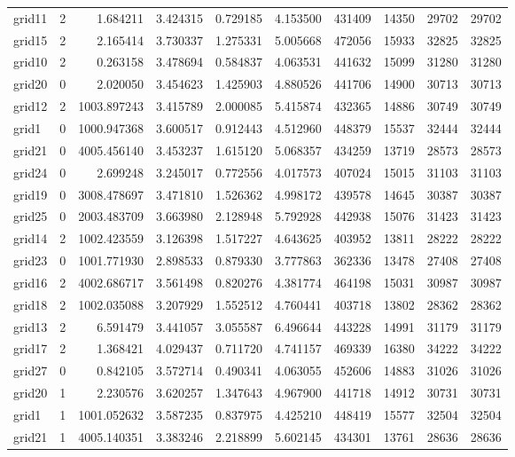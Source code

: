 \documentclass[../../../thesis.tex]{subfiles}
\begin{document}
\begin{longtable}{|l|r|r|r|r|r|r|r|r|r|}
grid11 & 2 & 1.684211 & 3.424315 & 0.729185 & 4.153500 & 431409 & 14350 & 29702 & 29702 \\
grid15 & 2 & 2.165414 & 3.730337 & 1.275331 & 5.005668 & 472056 & 15933 & 32825 & 32825 \\
grid10 & 2 & 0.263158 & 3.478694 & 0.584837 & 4.063531 & 441632 & 15099 & 31280 & 31280 \\
grid20 & 0 & 2.020050 & 3.454623 & 1.425903 & 4.880526 & 441706 & 14900 & 30713 & 30713 \\
grid12 & 2 & 1003.897243 & 3.415789 & 2.000085 & 5.415874 & 432365 & 14886 & 30749 & 30749 \\
grid1 & 0 & 1000.947368 & 3.600517 & 0.912443 & 4.512960 & 448379 & 15537 & 32444 & 32444 \\
grid21 & 0 & 4005.456140 & 3.453237 & 1.615120 & 5.068357 & 434259 & 13719 & 28573 & 28573 \\
grid24 & 0 & 2.699248 & 3.245017 & 0.772556 & 4.017573 & 407024 & 15015 & 31103 & 31103 \\
grid19 & 0 & 3008.478697 & 3.471810 & 1.526362 & 4.998172 & 439578 & 14645 & 30387 & 30387 \\
grid25 & 0 & 2003.483709 & 3.663980 & 2.128948 & 5.792928 & 442938 & 15076 & 31423 & 31423 \\
grid14 & 2 & 1002.423559 & 3.126398 & 1.517227 & 4.643625 & 403952 & 13811 & 28222 & 28222 \\
grid23 & 0 & 1001.771930 & 2.898533 & 0.879330 & 3.777863 & 362336 & 13478 & 27408 & 27408 \\
grid16 & 2 & 4002.686717 & 3.561498 & 0.820276 & 4.381774 & 464198 & 15031 & 30987 & 30987 \\
grid18 & 2 & 1002.035088 & 3.207929 & 1.552512 & 4.760441 & 403718 & 13802 & 28362 & 28362 \\
grid13 & 2 & 6.591479 & 3.441057 & 3.055587 & 6.496644 & 443228 & 14991 & 31179 & 31179 \\
grid17 & 2 & 1.368421 & 4.029437 & 0.711720 & 4.741157 & 469339 & 16380 & 34222 & 34222 \\
grid27 & 0 & 0.842105 & 3.572714 & 0.490341 & 4.063055 & 452606 & 14883 & 31026 & 31026 \\
grid20 & 1 & 2.230576 & 3.620257 & 1.347643 & 4.967900 & 441718 & 14912 & 30731 & 30731 \\
grid1 & 1 & 1001.052632 & 3.587235 & 0.837975 & 4.425210 & 448419 & 15577 & 32504 & 32504 \\
grid21 & 1 & 4005.140351 & 3.383246 & 2.218899 & 5.602145 & 434301 & 13761 & 28636 & 28636 \\

\end{longtable}
\end{document}
